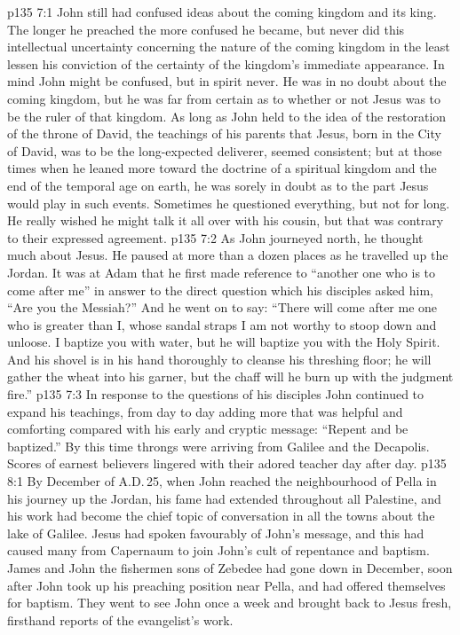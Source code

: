 \vs p135 7:1 John still had confused ideas about the coming kingdom and its king. The longer he preached the more confused he became, but never did this intellectual uncertainty concerning the nature of the coming kingdom in the least lessen his conviction of the certainty of the kingdom’s immediate appearance. In mind John might be confused, but in spirit never. He was in no doubt about the coming kingdom, but he was far from certain as to whether or not Jesus was to be the ruler of that kingdom. As long as John held to the idea of the restoration of the throne of David, the teachings of his parents that Jesus, born in the City of David, was to be the long\hyp{}expected deliverer, seemed consistent; but at those times when he leaned more toward the doctrine of a spiritual kingdom and the end of the temporal age on earth, he was sorely in doubt as to the part Jesus would play in such events. Sometimes he questioned everything, but not for long. He really wished he might talk it all over with his cousin, but that was contrary to their expressed agreement.
\vs p135 7:2 \pc As John journeyed north, he thought much about Jesus. He paused at more than a dozen places as he travelled up the Jordan. It was at Adam that he first made reference to “another one who is to come after me” in answer to the direct question which his disciples asked him, “Are you the Messiah?” And he went on to say: “There will come after me one who is greater than I, whose sandal straps I am not worthy to stoop down and unloose. I baptize you with water, but he will baptize you with the Holy Spirit. And his shovel is in his hand thoroughly to cleanse his threshing floor; he will gather the wheat into his garner, but the chaff will he burn up with the judgment fire.”
\vs p135 7:3 In response to the questions of his disciples John continued to expand his teachings, from day to day adding more that was helpful and comforting compared with his early and cryptic message: “Repent and be baptized.” By this time throngs were arriving from Galilee and the Decapolis. Scores of earnest believers lingered with their adored teacher day after day.
\vs p135 8:1 By December of A.D.\,25, when John reached the neighbourhood of Pella in his journey up the Jordan, his fame had extended throughout all Palestine, and his work had become the chief topic of conversation in all the towns about the lake of Galilee. Jesus had spoken favourably of John’s message, and this had caused many from Capernaum to join John’s cult of repentance and baptism. James and John the fishermen sons of Zebedee had gone down in December, soon after John took up his preaching position near Pella, and had offered themselves for baptism. They went to see John once a week and brought back to Jesus fresh, firsthand reports of the evangelist’s work.
